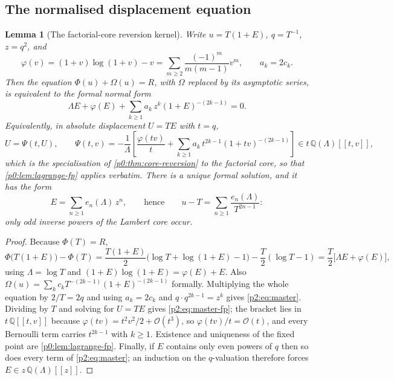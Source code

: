 \documentclass[11pt,a4paper,oneside]{book}
\theoremstyle{plain}
\newtheorem{lemma}[theorem]{Lemma}
\theoremstyle{definition}
\theoremstyle{remark}
\newcommand{\Rat}{\mathbb{Q}}
\newcommand{\bigO}{\mathcal{O}}
\begin{document}
\subsection{The normalised displacement equation}

\begin{lemma}[The factorial-core reversion kernel]
\label{p2:lem:normalized}
Write \(u=T(1+E)\), \(q=T^{-1}\), \(z=q^2\), and
\begin{equation}
 \varphi(v)=(1+v)\log(1+v)-v=\sum_{m\ge2}\frac{(-1)^m}{m(m-1)}v^m,
 \qquad
 a_k=2c_k .
 \label{p2:eq:varphi}
\end{equation}
Then the equation \(\Phi(u)+\Omega(u)=R\), with \(\Omega\) replaced by its
asymptotic series, is equivalent to the formal normal form
\begin{equation}
 \boxed{\;
 \Lambda E+\varphi(E)+\sum_{k\ge1}a_k\,z^k(1+E)^{-(2k-1)}=0 . \;}
 \label{p2:eq:master}
\end{equation}
Equivalently, in absolute displacement \(U=TE\) with \(t=q\),
\begin{equation}
 U=\Psi(t,U),
 \qquad
 \Psi(t,v)=-\frac1\Lambda\left[
 \frac{\varphi(tv)}t
 +\sum_{k\ge1}a_k\,t^{2k-1}(1+tv)^{-(2k-1)}\right]
 \in t\,\Rat(\Lambda)[[t,v]] ,
 \label{p2:eq:master-fp}
\end{equation}
which is the specialisation of \cref{p0:thm:core-reversion} to the factorial
core, so that \cref{p0:lem:lagrange-fp} applies verbatim.  There is a unique
formal solution, and it has the form
\begin{equation}
 E=\sum_{n\ge1}e_n(\Lambda)\,z^n,
 \qquad\text{hence}\qquad
 u-T=\sum_{n\ge1}\frac{e_n(\Lambda)}{T^{2n-1}} :
 \label{p2:eq:E-series}
\end{equation}
only \emph{odd} inverse powers of the Lambert core occur.
\end{lemma}

\begin{proof}
Because \(\Phi(T)=R\),
\[
 \Phi\bigl(T(1+E)\bigr)-\Phi(T)
 =\frac{T(1+E)}2\bigl(\log T+\log(1+E)-1\bigr)-\frac T2(\log T-1)
 =\frac T2\bigl[\Lambda E+\varphi(E)\bigr],
\]
using \(\Lambda=\log T\) and
\((1+E)\log(1+E)=\varphi(E)+E\).  Also
\(\Omega(u)=\sum_{k}c_kT^{-(2k-1)}(1+E)^{-(2k-1)}\) formally.  Multiplying the
whole equation by \(2/T=2q\) and using \(a_k=2c_k\) and
\(q\cdot q^{2k-1}=z^k\) gives \cref{p2:eq:master}.  Dividing by \(T\) and
solving for \(U=TE\) gives \cref{p2:eq:master-fp}; the bracket lies in
\(t\,\Rat[[t,v]]\) because \(\varphi(tv)=t^2v^2/2+\bigO(t^3)\), so
\(\varphi(tv)/t=\bigO(t)\), and every Bernoulli term carries \(t^{2k-1}\) with
\(k\ge1\).  Existence and uniqueness of the fixed point are
\cref{p0:lem:lagrange-fp}.  Finally, if \(E\) contains only even powers of
\(q\) then so does every term of \cref{p2:eq:master}; an induction on the
\(q\)-valuation therefore forces \(E\in z\,\Rat(\Lambda)[[z]]\).
\end{proof}
\end{document}
